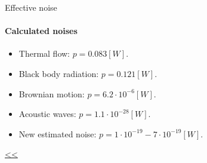 \documentclass{beamer}
\begin{document}
\begin{frame}{\hypertarget{frame:Effective noise 1}{Effective noise}}
	\framesubtitle{Calculated noises}
	\begin{itemize}	
		\item Thermal flow: $p=0.083[W]$.
		\item Black body radiation: $p=0.121[W]$.
		\item Brownian motion: $p=6.2\cdot 10^{-6}[W]$.
		\item Acoustic waves: $p=1.1\cdot 10^{-28}[W]$.
		\item New estimated noise: $p=1\cdot 10^{-19} - 7\cdot 10^{-19}[W]$.
					
	\end{itemize}
	\hyperlink{frame:Effective noise}{<<} 
\end{frame}
\end{document}
